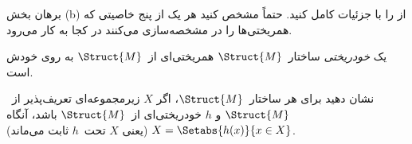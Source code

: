\documentclass[../../../include/open-logic-section]{subfiles}
\begin{document}
\begin{prob}
برهان بخش (b) از  را با جزئیات کامل
کنید. حتماً مشخص کنید هر یک از پنج خاصیتی که همریختی‌ها را در
 مشخصه‌سازی می‌کنند در کجا به
کار می‌رود.
\end{prob}

\begin{defn}
یک \emph{خودریختی} ساختار~$\Struct{M}$ همریختی‌ای از~$\Struct{M}$ به
روی خودش است.
\end{defn}

\begin{prob}
نشان دهید برای هر ساختار~$\Struct{M}$، اگر $X$ زیرمجموعه‌ای تعریف‌پذیر
از~$\Struct{M}$ و $h$ خودریختی‌ای از~$\Struct{M}$ باشد، آنگاه
$X = \Setabs{h(x)}{x \in X}$ (یعنی $X$ تحت~$h$ ثابت می‌ماند).
\end{prob}
\end{document}
